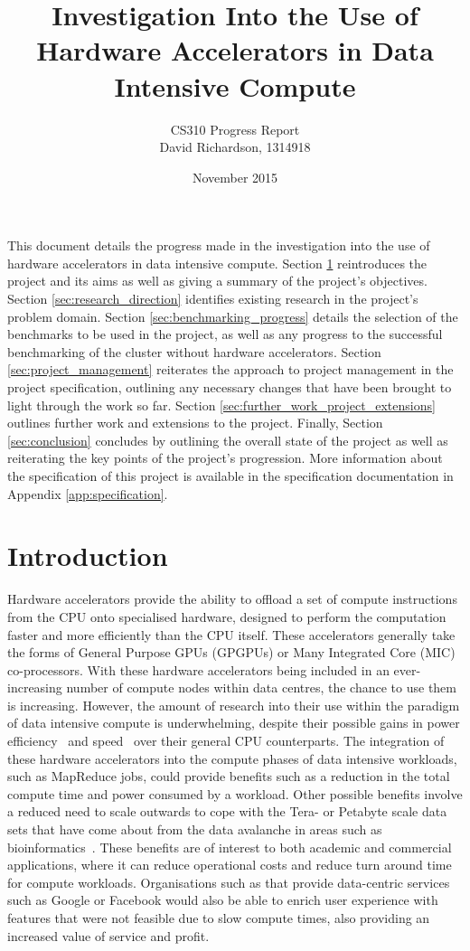 \documentclass[12pt,a4paper]{article}
\title{Investigation Into the Use of Hardware Accelerators in Data Intensive Compute}
\author{CS310 Progress Report\\David Richardson, 1314918}
\date{November 2015}
\begin{document}
	\maketitle
	
	This document details the progress made in the investigation into the use of hardware accelerators in data intensive compute. Section \ref{sec:introduction} reintroduces the project and its aims as well as giving a summary of the project's objectives. Section \ref{sec:research_direction} identifies existing research in the project's problem domain. Section \ref{sec:benchmarking_progress} details the selection of the benchmarks to be used in the project, as well as any progress to the successful benchmarking of the cluster without hardware accelerators. Section \ref{sec:project_management} reiterates the approach to project management in the project specification, outlining any necessary changes that have been brought to light through the work so far. Section \ref{sec:further_work_project_extensions} outlines further work and extensions to the project. Finally, Section \ref{sec:conclusion} concludes by outlining the overall state of the project as well as reiterating the key points of the project's progression. More information about the specification of this project is available in the specification documentation in Appendix \ref{app:specification}.

	\section{Introduction}
	\label{sec:introduction}
	
	    Hardware accelerators provide the ability to offload a set of compute instructions from the CPU onto specialised hardware, designed to perform the computation faster and more efficiently than the CPU itself. These accelerators generally take the forms of General Purpose GPUs (GPGPUs) or Many Integrated Core (MIC) co-processors. With these hardware accelerators being included in an ever-increasing number of compute nodes within data centres, the chance to use them is increasing. However, the amount of research into their use within the paradigm of data intensive compute is underwhelming, despite their possible gains in power efficiency~\cite{energy-efficient-gpu} and speed~\cite{accelerating-matrix-product, quantitative-finance-gpu} over their general CPU counterparts. The integration of these hardware accelerators into the compute phases of data intensive workloads, such as MapReduce jobs, could provide benefits such as a reduction in the total compute time and power consumed by a workload. Other possible benefits involve a reduced need to scale outwards to cope with the Tera- or Petabyte scale data sets that have come about from the data avalanche in areas such as bioinformatics~\cite{big-data-biocuration}. These benefits are of interest to both academic and commercial applications, where it can reduce operational costs and reduce turn around time for compute workloads. Organisations such as that provide data-centric services such as Google or Facebook would also be able to enrich user experience with features that were not feasible due to slow compute times, also providing an increased value of service and profit.
	
\end{document}
